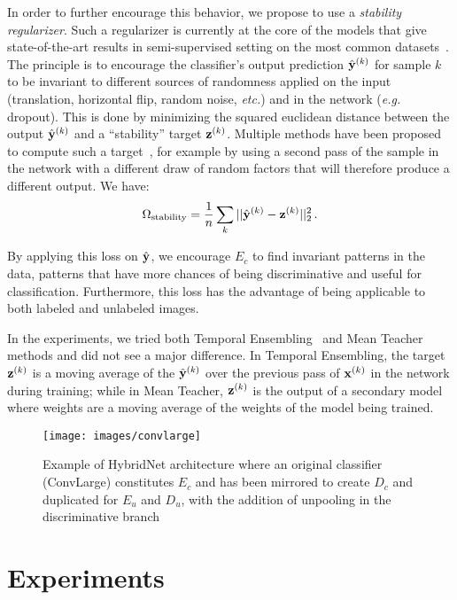 \documentclass[runningheads]{llncs}
\begin{document}
In order to further encourage this behavior, we propose to use a \textit{stability regularizer}. Such a regularizer is currently at the core of the models that give state-of-the-art results in semi-supervised setting on the most common datasets~\cite{Sajjadi2016,Laine2016,Tarvainen2017}. The principle is to encourage the classifier's output prediction $\hat{\mathbf{y}}^{(k)}$ for sample $k$ to be invariant to different sources of randomness applied on the input (translation, horizontal flip, random noise, \textit{etc.}) and in the network (\textit{e.g.} dropout). This is done by minimizing the squared euclidean distance between the output $\hat{\mathbf{y}}^{(k)}$ and a ``stability'' target $\mathbf{z}^{(k)}$. Multiple methods have been proposed to compute such a target~\cite{Sajjadi2016,Laine2016,Tarvainen2017}, for example by using a second pass of the sample in the network with a different draw of random factors that will therefore produce a different output. We have:
\begin{equation}
	\mathrm{\Omega}_\mathrm{stability} = \frac{1}{n} \sum_k ||\hat{\mathbf{y}}^{(k)} - \mathbf{z}^{(k)}||_2^2\,.
\end{equation}

By applying this loss on $\hat{\mathbf{y}}$, we encourage $E_c$ to find invariant patterns in the data, patterns that have more chances of being discriminative and useful for classification. Furthermore, this loss has the advantage of being applicable to both labeled and unlabeled images.

In the experiments, we tried both Temporal Ensembling~\cite{Laine2016} and Mean Teacher~\cite{Tarvainen2017} methods and did not see a major difference. In Temporal Ensembling, the target $\mathbf{z}^{(k)}$ is a moving average of the $\hat{\mathbf{y}}^{(k)}$ over the previous pass of $\mathbf{x}^{(k)}$ in the network during training; while in Mean Teacher, $\mathbf{z}^{(k)}$ is the output of a secondary model where weights are a moving average of the weights of the model being trained.


\begin{figure}[tb]
	\centering
	\texttt{[image: images/convlarge]}
    \caption{Example of HybridNet architecture where an original classifier (ConvLarge) constitutes $E_c$ and has been mirrored to create $D_c$ and duplicated for $E_u$ and $D_u$, with the addition of unpooling in the discriminative branch}
    \label{fig:cifar10-archi}
\end{figure}

\section{Experiments}
\label{sec:experiements}
\end{document}
